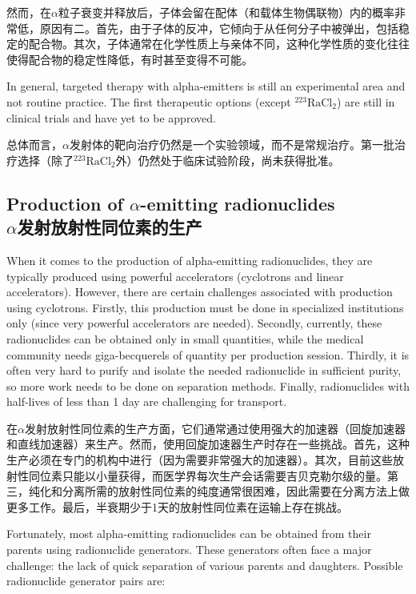 \documentclass[dvipsnames, svgnames,a4paper,11pt]{article}
\begin{document}
然而，在$\alpha$粒子衰变并释放后，子体会留在配体（和载体生物偶联物）内的概率非常低，原因有二。首先，由于子体的反冲，它倾向于从任何分子中被弹出，包括稳定的配合物。其次，子体通常在化学性质上与亲体不同，这种化学性质的变化往往使得配合物的稳定性降低，有时甚至变得不可能。  

In general, targeted therapy with alpha-emitters is still an experimental area and not routine practice. The first therapeutic options (except \(\mathrm{^{223}RaCl_2}\)) are still in clinical trials and have yet to be approved.

总体而言，$\alpha$发射体的靶向治疗仍然是一个实验领域，而不是常规治疗。第一批治疗选择（除了\(\mathrm{^{223}RaCl_2}\)外）仍然处于临床试验阶段，尚未获得批准。

\subsection{Production of \(\alpha\)-emitting radionuclides\\ $\alpha$发射放射性同位素的生产}  
When it comes to the production of alpha-emitting radionuclides, they are typically produced using powerful accelerators (cyclotrons and linear accelerators). However, there are certain challenges associated with production using cyclotrons. Firstly, this production must be done in specialized institutions only (since very powerful accelerators are needed). Secondly, currently, these radionuclides can be obtained only in small quantities, while the medical community needs giga-becquerels of quantity per production session. Thirdly, it is often very hard to purify and isolate the needed radionuclide in sufficient purity, so more work needs to be done on separation methods. Finally, radionuclides with half-lives of less than 1 day are challenging for transport.  

在$\alpha$发射放射性同位素的生产方面，它们通常通过使用强大的加速器（回旋加速器和直线加速器）来生产。然而，使用回旋加速器生产时存在一些挑战。首先，这种生产必须在专门的机构中进行（因为需要非常强大的加速器）。其次，目前这些放射性同位素只能以小量获得，而医学界每次生产会话需要吉贝克勒尔级的量。第三，纯化和分离所需的放射性同位素的纯度通常很困难，因此需要在分离方法上做更多工作。最后，半衰期少于1天的放射性同位素在运输上存在挑战。  

Fortunately, most alpha-emitting radionuclides can be obtained from their parents using radionuclide generators. These generators often face a major challenge: the lack of quick separation of various parents and daughters. Possible radionuclide generator pairs are:  
\end{document}
